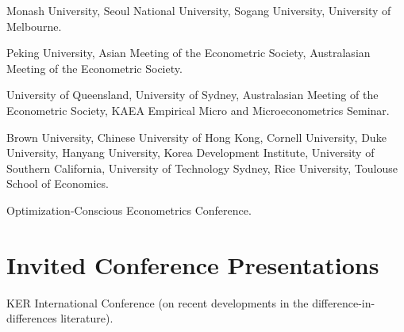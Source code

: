 \documentclass[10pt,letterpaper]{article}
\begin{document}
\begin{description}[font=\mdseries]
\item[2024]
  Monash University,
  Seoul National University,
  Sogang University,
  University of Melbourne.
\item[2023]
  Peking University,
  Asian Meeting of the Econometric Society,
  Australasian Meeting of the Econometric Society.
\item[2022]
  University of Queensland,
  University of Sydney,
  Australasian Meeting of the Econometric Society,
  KAEA Empirical Micro and Microeconometrics Seminar.
\item[2020]
  Brown University,
  Chinese University of Hong Kong,
  Cornell University,
  Duke University,
  Hanyang University,
  Korea Development Institute,
  University of Southern California,
  University of Technology Sydney,
  Rice University,
  Toulouse School of Economics.
\item[2019]
  Optimization-Conscious Econometrics Conference.
\end{description}

\section*{Invited Conference Presentations}

\begin{description}[font=\mdseries]
\item[2024]
  KER International Conference (on recent developments in the difference-in-differences literature).
\end{description}
\end{document}
